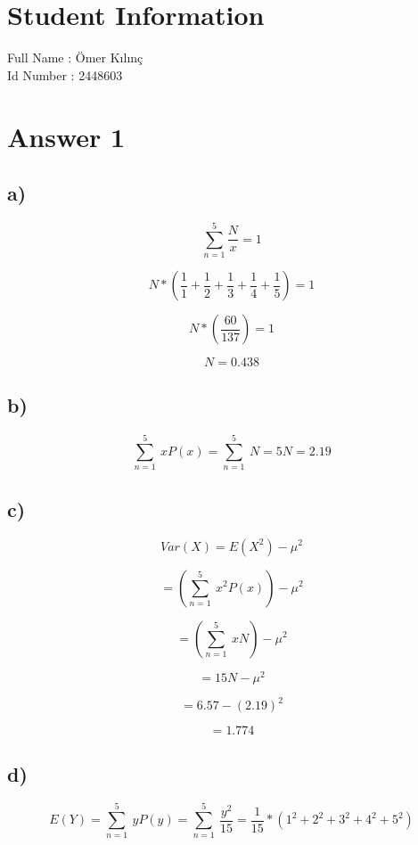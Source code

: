 \documentclass[12pt]{article}
\begin{document}
\section*{Student Information } 
Full Name :  Ömer Kılınç\\
Id Number :  2448603\\

\section*{Answer 1}

\subsection*{a)} 

\[ \sum_{n=1}^{5} \frac{N}{x} = 1 \]

\[ N*(\frac{1}{1} + \frac{1}{2} + \frac{1}{3} + \frac{1}{4} + \frac{1}{5}) = 1 \]

\[ N*(\frac{60}{137} ) = 1 \]

\[ N = 0.438 \]


\subsection*{b)} 

\[ \sum_{n=1}^{5} \ xP(x) = \sum_{n=1}^{5} \ N = 5N = 2.19 \]

\subsection*{c)} 

\[ Var(X) = E(X^{2}) - \mu^{2} \]

\[ = (\sum_{n=1}^{5} \ x^{2}P(x) ) - \mu^{2} \]

\[ = (\sum_{n=1}^{5} \ xN) - \mu^{2} \]

\[ = 15N - \mu^{2} \]

\[ = 6.57 - (2.19)^{2} \]

\[ = 1.774 \]

\subsection*{d)} 

\[ E(Y) = \sum_{n=1}^{5} \ yP(y) = \sum_{n=1}^{5} \ \frac{y^{2}}{15} = \frac{1}{15} * ( 1^{2} + 2^{2} + 3^{2} + 4^{2} + 5^{2}) \]
\end{document}
